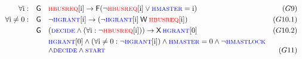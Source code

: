 \[{\begin{array}{rrlr}
\forall \mathrm i: & \always & \hbusreqi \impl \eventually (\neg
\hbusreqi \lor \hmaster = \mathrm i) & (G9)\\[3pt]
\forall \mathrm i\neq 0: & \always & \neg \hgranti \impl (\neg \hgranti \weakuntil \hbusreqi) & (G10.1)\\[3pt]
& \always & (\hdecide \land (\forall \mathrm i: \neg \hbusreqi)) \impl \nextt \hgrant[0] & (G10.2) \\[3pt]
& & \hgrant[0] \land (\forall \mathrm i \neq 0: \neg \hgranti) \land \hmaster = 0 \land \neg \hmastlock \\
& & \land \hdecide \land \hstart & (G11)
\end{array}}\]
